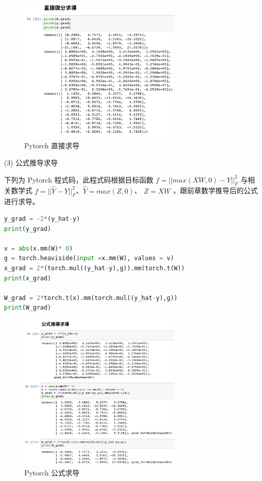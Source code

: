 \documentclass[11pt,UTF8]{ctexart}
\begin{document}
\begin{figure}[H]
\centering 
\includegraphics[width=0.7\textwidth]{c2.png} 
\caption{Pytorch 直接求导}
\label{Code.2}
\end{figure}

\newpage

(3) 公式推导求导
\newline

下列为 Pytorch 程式码，此程式码根据目标函数 $f = ||max(XW,0)-Y||^2_F $ 与相关数学式 $f = ||\hat{Y}-Y||^2_F $、$\hat{Y} = max(Z,0)$、 $Z = XW$ ，跟前章数学推导后的公式进行求导。

	\begin{lstlisting}[language={python}]
y_grad = -2*(y_hat-y)
print(y_grad)

v = abs(x.mm(W)* 0)
g = torch.heaviside(input =x.mm(W), values = v)
x_grad = 2*(torch.mul((y_hat-y),g)).mm(torch.t(W))
print(x_grad)

W_grad = 2*torch.t(x).mm(torch.mul((y_hat-y),g))
print(W_grad)

	\end{lstlisting}


\begin{figure}[H]
\centering 
\includegraphics[width=0.7\textwidth]{c3.png} 
\caption{Pytorch 公式求导}
\label{Code.3}
\end{figure}

\clearpage
\end{document}
